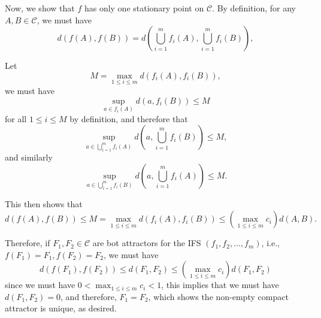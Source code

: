 Now, we show that \(f\) has only one stationary point on \(\mathcal{C}\). By definition, for any \(A, B \in \mathcal{C}\), we must have
\[
d(f(A), f(B)) = d\left(\bigcup_{i = 1}^{m} f_i(A), \bigcup_{i = 1}^{m} f_i(B)\right),
\]

Let
\[M = \max_{1 \leq i \leq m} d(f_i(A), f_i(B)),\]
we must have
\[\sup_{a \in f_i(A)} d(a, f_i(B)) \leq M\]
for all \(1 \leq i \leq M\) by definition, and therefore that
\[\sup_{a \in \bigcup_{i = 1}^{m} f_i(A)} d\left(a, \bigcup_{i = 1}^{m} f_i(B)\right) \leq M,\]
and similarly
\[\sup_{a \in \bigcup_{i = 1}^{m} f_i(B)} d\left(a, \bigcup_{i = 1}^{m} f_i(A)\right) \leq M.\]

This then shows that
\[
d(f(A), f(B)) \leq M = \max_{1 \leq i \leq m} d(f_i(A), f_i(B)) \leq \left(\max_{1 \leq i \leq m} c_i\right)d(A, B).
\]

Therefore, if \(F_1, F_2 \in \mathcal{C}\) are bot attractors for the IFS \(\left(f_1, f_2, \ldots, f_m\right)\), i.e., \(f(F_1) = F_1, f(F_2) = F_2\), we must have
\[
d(f(F_1), f(F_2)) \leq d(F_1, F_2) \leq \left(\max_{1 \leq i \leq m} c_i\right) d(F_1, F_2)
\]
since we must have \(0 < \max_{1 \leq i \leq m} c_i < 1\), this implies that we must have \(d(F_1, F_2) = 0\), and therefore, \(F_1 = F_2\), which shows the non-empty compact attractor is unique, as desired.